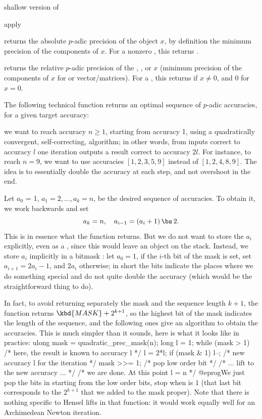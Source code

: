  shallow version of 

 apply 

 returns the absolute $p$-adic precision of
the object $x$, by definition the minimum precision of the components of $x$.
For a nonzero , this returns .

 returns the relative $p$-adic
precision of the , , or  $x$ (minimum precision
of the components of $x$ for  or vector/matrices).
For a , this returns  if $x\neq0$, and $0$ for $x=0$.


The following technical function returns an optimal sequence of $p$-adic
accuracies, for a given target accuracy:

 we want to reach accuracy
$n\geq 1$, starting from accuracy 1, using a quadratically convergent,
self-correcting, algorithm; in other words, from inputs correct to accuracy
$l$ one iteration outputs a result correct to accuracy $2l$.
For instance, to reach $n = 9$, we want to use accuracies
$[1,2,3,5,9]$ instead of $[1,2,4,8,9]$. The idea is to essentially double
the accuracy at each step, and not overshoot in the end.

Let $a_0$ = 1, $a_1 = 2, \ldots, a_k = n$, be the desired sequence of
accuracies. To obtain it, we work backwards and set
$$ a_k = n,\quad a_{i-1} = (a_i + 1)\,\bs\, 2.$$
This is in essence what the function returns.
But we do not want to store the $a_i$ explicitly, even as a ,
since this would leave an object on the stack. Instead, we store $a_i$
implicitly in a bitmask : let $a_0 = 1$, if the $i$-th bit of the
mask is set, set $a_{i+1} = 2a_i - 1$, and $2a_i$ otherwise; in short the
bits indicate the places where we do something special and do not quite
double the accuracy (which would be the straightforward thing to do).

In fact, to avoid returning separately the mask and the sequence length
$k+1$, the function returns $\kbd{MASK} + 2^{k+1}$, so the highest bit of
the mask indicates the length of the sequence, and the following ones give
an algorithm to obtain the accuracies. This is much simpler than it sounds,
here is what it looks like in practice:
\bprog
  ulong mask = quadratic_prec_mask(n);
  long l = 1;
  while (mask > 1) {            /* here, the result is known to accuracy l */
    l = 2*l; if (mask & 1) l--; /* new accuracy l for the iteration */
    mask >>= 1;                 /* pop low order bit */
    /* ... lift to the new accuracy ... */
  }
  /* we are done. At this point l = n */
@eprog\noindent We just pop the bits in  starting from the low
order bits, stop when  is $1$ (that last bit corresponds to the
$2^{k+1}$ that we added to the mask proper). Note that there is nothing
specific to Hensel lifts in that function: it would work equally well for
an Archimedean Newton iteration.

